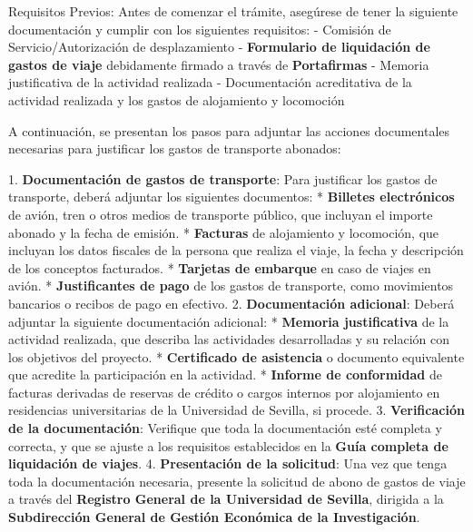 \documentclass{article}
\begin{document}
\begin{itemize}
\begin{itemize}
                        Requisitos Previos:
                        Antes de comenzar el trámite, asegúrese de tener la siguiente documentación y cumplir con los siguientes requisitos:
                        - Comisión de Servicio/Autorización de desplazamiento
                        - \textbf{Formulario de liquidación de gastos de viaje} debidamente firmado a través de \textbf{Portafirmas}
                        - Memoria justificativa de la actividad realizada
                        - Documentación acreditativa de la actividad realizada y los gastos de alojamiento y locomoción

                        A continuación, se presentan los pasos para adjuntar las acciones documentales necesarias para justificar los gastos de transporte abonados:

                        1. \textbf{Documentación de gastos de transporte}: Para justificar los gastos de transporte, deberá adjuntar los siguientes documentos:
                        * \textbf{Billetes electrónicos} de avión, tren o otros medios de transporte público, que incluyan el importe abonado y la fecha de emisión.
                        * \textbf{Facturas} de alojamiento y locomoción, que incluyan los datos fiscales de la persona que realiza el viaje, la fecha y descripción de los conceptos facturados.
                        * \textbf{Tarjetas de embarque} en caso de viajes en avión.
                        * \textbf{Justificantes de pago} de los gastos de transporte, como movimientos bancarios o recibos de pago en efectivo.
                        2. \textbf{Documentación adicional}: Deberá adjuntar la siguiente documentación adicional:
                        * \textbf{Memoria justificativa} de la actividad realizada, que describa las actividades desarrolladas y su relación con los objetivos del proyecto.
                        * \textbf{Certificado de asistencia} o documento equivalente que acredite la participación en la actividad.
                        * \textbf{Informe de conformidad} de facturas derivadas de reservas de crédito o cargos internos por alojamiento en residencias universitarias de la Universidad de Sevilla, si procede.
                        3. \textbf{Verificación de la documentación}: Verifique que toda la documentación esté completa y correcta, y que se ajuste a los requisitos establecidos en la \textbf{Guía completa de liquidación de viajes}.
                        4. \textbf{Presentación de la solicitud}: Una vez que tenga toda la documentación necesaria, presente la solicitud de abono de gastos de viaje a través del \textbf{Registro General de la Universidad de Sevilla}, dirigida a la \textbf{Subdirección General de Gestión Económica de la Investigación}.


\end{itemize}
\end{itemize}
\end{document}
